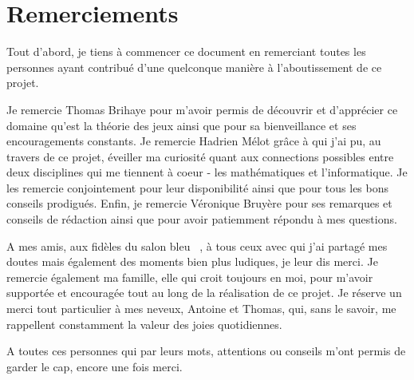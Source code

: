 \section*{Remerciements}
\thispagestyle{empty}


Tout d'abord, je tiens à commencer ce document en remerciant toutes les personnes ayant contribué d'une quelconque manière à l'aboutissement de ce projet.

Je remercie Thomas Brihaye pour m'avoir permis de découvrir et d'apprécier ce domaine qu'est la théorie des jeux ainsi que pour sa bienveillance et ses encouragements constants. Je remercie Hadrien Mélot grâce à qui j'ai pu, au travers de ce projet, éveiller ma curiosité quant aux connections possibles entre deux disciplines qui me tiennent à coeur - les mathématiques et l'informatique. Je les remercie conjointement pour leur disponibilité ainsi que pour tous les bons conseils prodigués. Enfin, je remercie Véronique Bruyère pour ses remarques et conseils de rédaction ainsi que pour avoir patiemment répondu à mes questions.

A mes amis, aux fidèles du \og salon bleu \fg~, à tous ceux avec qui j'ai partagé mes doutes mais également des moments bien plus ludiques, je leur dis merci. Je remercie également ma famille, elle qui croit toujours en moi, pour m'avoir supportée et encouragée tout au long de la réalisation de ce projet. Je réserve un merci tout particulier à mes neveux, Antoine et Thomas, qui, sans le savoir, me rappellent constamment la valeur des joies quotidiennes.

A toutes ces personnes qui par leurs mots, attentions ou conseils m'ont permis de garder le cap, encore une fois merci.